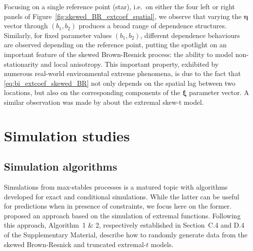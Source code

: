 \documentclass[12pt]{article}
\begin{document}
Focusing on a single reference point (star), i.e.~on either the four left or right panels of Figure~\ref{fig:skewed_BR_extcoef_spatial}, we observe that varying the $\bm \eta$ vector through $(b_1, b_2)$ produces a broad range of dependence structures. Similarly, for fixed parameter values $(b_1,b_2)$, different dependence behaviours are observed depending on the reference point, putting the spotlight on an important feature of the skewed Brown-Resnick process: the ability to model non-stationarity and local anisotropy. This important property, exhibited by numerous real-world environmental extreme phenomena, is due to the fact that \eqref{eq:bi_extcoef_skewed_BR} not only depends on the spatial lag between two locations, but also on the corresponding components of the $\bm \xi$ parameter vector. A similar observation was made by \citet{Beranger.etal:2017} about the extremal skew-t model.

\section{Simulation studies}
\label{sec:sim}

\subsection{Simulation algorithms}

Simulations from max-stables processes is a matured topic with algorithms developed for exact and conditional simulations. While the latter can be useful for predictions when in presence of constraints, we focus here on the former. \citet{Dombry.Engelke.Oesting:2016} proposed an approach based on the simulation of extremal functions.
Following this approach, Algorithm~1 \& 2, respectively established in Section~C.4 and D.4 of the Supplementary Material, describe how to randomly generate data from the skewed Brown-Resnick and truncated extremal-$t$ models. 
\end{document}
